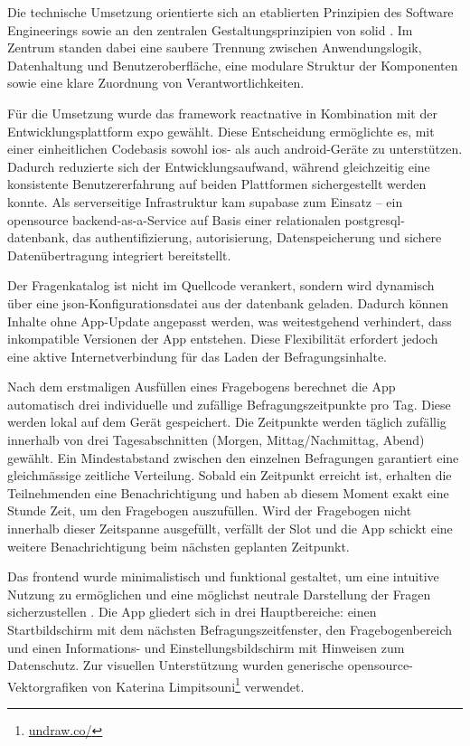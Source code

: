 Die technische Umsetzung orientierte sich an etablierten Prinzipien des Software Engineerings \parencite{sommervilleSoftwareEngineering2016} sowie an den zentralen Gestaltungsprinzipien von \gls{solid} \parencite{martinCleanArchitectureCraftsmans2018}. Im Zentrum standen dabei eine saubere Trennung zwischen Anwendungslogik, Datenhaltung und Benutzeroberfläche, eine modulare Struktur der Komponenten sowie eine klare Zuordnung von Verantwortlichkeiten.

Für die Umsetzung wurde das \gls{framework} \gls{reactnative} in Kombination mit der Entwicklungsplattform \gls{expo} gewählt. Diese Entscheidung ermöglichte es, mit einer einheitlichen Codebasis sowohl \gls{ios}- als auch \gls{android}-Geräte zu unterstützen. Dadurch reduzierte sich der Entwicklungsaufwand, während gleichzeitig eine konsistente Benutzererfahrung auf beiden Plattformen sichergestellt werden konnte. Als serverseitige Infrastruktur kam \gls{supabase} zum Einsatz -- ein \gls{opensource} \gls{backend}-as-a-Service auf Basis einer relationalen \gls{postgresql}-\gls{datenbank}, das \gls{authentifizierung}, \gls{autorisierung}, Datenspeicherung und sichere Datenübertragung integriert bereitstellt.

Der Fragenkatalog ist nicht im Quellcode verankert, sondern wird dynamisch über eine \gls{json}-Konfigurationsdatei aus der \gls{datenbank} geladen. Dadurch können Inhalte ohne App-Update angepasst werden, was weitestgehend verhindert, dass inkompatible Versionen der App entstehen. Diese Flexibilität erfordert jedoch eine aktive Internetverbindung für das Laden der Befragungsinhalte.

Nach dem erstmaligen Ausfüllen eines Fragebogens berechnet die App automatisch drei individuelle und zufällige Befragungszeitpunkte pro Tag. Diese werden lokal auf dem Gerät gespeichert. Die Zeitpunkte werden täglich zufällig innerhalb von drei Tagesabschnitten (Morgen, Mittag/Nachmittag, Abend) gewählt. Ein Mindestabstand zwischen den einzelnen Befragungen garantiert eine gleichmässige zeitliche Verteilung. Sobald ein Zeitpunkt erreicht ist, erhalten die Teilnehmenden eine Benachrichtigung und haben ab diesem Moment exakt eine Stunde Zeit, um den Fragebogen auszufüllen. Wird der Fragebogen nicht innerhalb dieser Zeitspanne ausgefüllt, verfällt der Slot und die App schickt eine weitere Benachrichtigung beim nächsten geplanten Zeitpunkt.

Das \gls{frontend} wurde minimalistisch und funktional gestaltet, um eine intuitive Nutzung zu ermöglichen und eine möglichst neutrale Darstellung der Fragen sicherzustellen \parencite{rogersInteractionDesignHumancomputer2023}. Die App gliedert sich in drei Hauptbereiche: einen Startbildschirm mit dem nächsten Befragungszeitfenster, den Fragebogenbereich und einen Informations- und Einstellungsbildschirm mit Hinweisen zum Datenschutz. Zur visuellen Unterstützung wurden generische \gls{opensource}-Vektorgrafiken von Katerina Limpitsouni\footnote{\href{https://undraw.co/}{undraw.co/}} verwendet.


